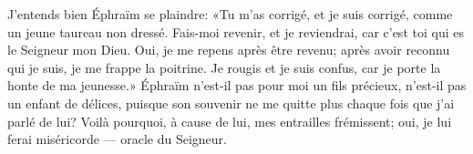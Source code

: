 J’entends bien Éphraïm se plaindre:
	«Tu m’as corrigé, et je suis corrigé, comme un jeune taureau non dressé.
Fais-moi revenir, et je reviendrai,
	car c’est toi qui es le Seigneur mon Dieu.
Oui, je me repens après être revenu;
	après avoir reconnu qui je suis, je me frappe la poitrine.
Je rougis et je suis confus, car je porte la honte de ma jeunesse.»
Éphraïm n’est-il pas pour moi un fils précieux,
	n’est-il pas un enfant de délices,
	puisque son souvenir ne me quitte plus chaque fois que j’ai parlé de lui?
Voilà pourquoi, à cause de lui, mes entrailles frémissent;
	oui, je lui ferai miséricorde --- oracle du Seigneur.
